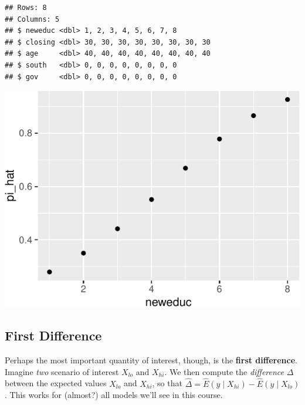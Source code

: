 \documentclass[
]{book}
\newenvironment{Shaded}{\begin{snugshade}}{\end{snugshade}}
\newcommand{\AttributeTok}[1]{\textcolor[rgb]{0.77,0.63,0.00}{#1}}
\newcommand{\FunctionTok}[1]{\textcolor[rgb]{0.00,0.00,0.00}{#1}}
\newcommand{\NormalTok}[1]{#1}
\newcommand{\OtherTok}[1]{\textcolor[rgb]{0.56,0.35,0.01}{#1}}
\newcommand{\SpecialCharTok}[1]{\textcolor[rgb]{0.00,0.00,0.00}{#1}}
\newcommand{\StringTok}[1]{\textcolor[rgb]{0.31,0.60,0.02}{#1}}
\begin{document}
\begin{verbatim}
## Rows: 8
## Columns: 5
## $ neweduc <dbl> 1, 2, 3, 4, 5, 6, 7, 8
## $ closing <dbl> 30, 30, 30, 30, 30, 30, 30, 30
## $ age     <dbl> 40, 40, 40, 40, 40, 40, 40, 40
## $ south   <dbl> 0, 0, 0, 0, 0, 0, 0, 0
## $ gov     <dbl> 0, 0, 0, 0, 0, 0, 0, 0
\end{verbatim}

\begin{Shaded}
\end{Shaded}

\includegraphics{03-05-first-difference_files/figure-latex/unnamed-chunk-4-1.pdf}

\hypertarget{first-difference}{%
\subsection{First Difference}\label{first-difference}}

Perhaps the most important quantity of interest, though, is the
\textbf{first difference}. Imagine \emph{two} scenario of interest
\(X_{lo}\) and \(X_{hi}\). We then compute the \emph{difference}
\(\Delta\) between the expected values \(X_{lo}\) and \(X_{hi}\), so
that \(\hat{\Delta} = \hat{E}(y \mid X_{hi}) - \hat{E}(y \mid X_{lo})\).
This works for (almost?) all models we'll see in this course.
\end{document}
